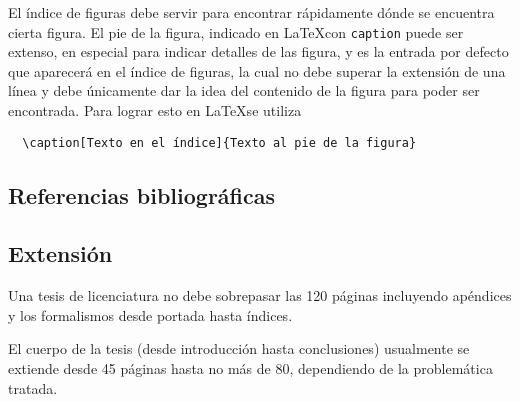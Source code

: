 El índice de figuras debe servir para encontrar rápidamente dónde se encuentra
cierta figura.  El pie de la figura, indicado en \LaTeX con \texttt{caption}
puede ser extenso, en especial para indicar detalles de las figura, y es la
entrada por defecto que aparecerá en el índice de figuras, la cual no debe
superar la extensión de una línea y debe únicamente dar la idea del contenido
de la figura para poder ser encontrada.  Para lograr esto en \LaTeX se utiliza
\begin{verbatim}
  \caption[Texto en el índice]{Texto al pie de la figura}
\end{verbatim}

\subsection{Referencias bibliográficas}



\subsection{Extensión}

Una tesis de licenciatura no debe sobrepasar las 120 páginas incluyendo
apéndices y los formalismos desde portada hasta índices.

El cuerpo de la tesis (desde introducción hasta conclusiones) usualmente se
extiende desde 45 páginas hasta no más de 80, dependiendo de la problemática
tratada.


